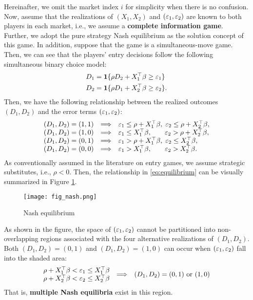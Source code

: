\documentclass[11pt, A4paper, openany, uplatex]{book}
\begin{document}
Hereinafter, we omit the market index $i$ for simplicity when there is no confusion.
Now, assume that the realizations of $(X_1, X_2)$ and $(\varepsilon_1, \varepsilon_2)$ are known to both players in each market, i.e., we assume a \textbf{complete information game}.
Further, we adopt the pure strategy Nash equilibrium as the solution concept of this game.
In addition, suppose that the game is a simultaneous-move game.
Then, we can see that the players' entry decisions follow the following simultaneous binary choice model:
\begin{align}\label{eq:entry}
\begin{split}
D_1 & = \mathbf{1}\{\rho D_2 + X_1^\top \beta \geq \varepsilon_1 \} \\
D_2 & = \mathbf{1}\{\rho D_1 + X_2^\top \beta \geq \varepsilon_2 \}.
\end{split}
\end{align}
Then, we have the following relationship between the realized outcomes $(D_1, D_2)$ and the error terms $(\varepsilon_1, \varepsilon_2)$:
\begin{equation} \label{eq:equilibrium}
\begin{array}{lcl}
(D_1, D_2) = (1, 1) & \Longrightarrow & \varepsilon_1 \le \rho + X_1^\top \beta, \; \varepsilon_2 \le \rho + X_2^\top\beta, \\
(D_1, D_2) = (1, 0) & \Longrightarrow & \varepsilon_1 \le X_1^\top \beta, \;\;\;\;\;\;\;  \varepsilon_2 > \rho + X_2^\top\beta, \\
(D_1, D_2) = (0, 1) & \Longrightarrow & \varepsilon_1 > \rho + X_1^\top \beta, \; \varepsilon_2 \le X_2^\top\beta, \\
(D_1, D_2) = (0, 0) & \Longrightarrow & \varepsilon_1 > X_1^\top \beta, \;\;\;\;\;\;\; \varepsilon_2 > X_2^\top\beta.
\end{array}
\end{equation}
As conventionally assumed in the literature on entry games, we assume strategic substitutes, i.e., $\rho < 0$.
Then, the relationship in \eqref{eq:equilibrium} can be visually summarized in Figure \ref{fig:nash}.
\begin{figure}[h!]
	\begin{center}
		\texttt{[image: fig\_nash.png]}
		\caption{Nash equilibrium}
		\label{fig:nash}
	\end{center}
\end{figure}
As shown in the figure, the space of $(\varepsilon_1, \varepsilon_2)$ cannot be partitioned into non-overlapping regions associated with the four alternative realizations of $(D_1, D_2)$.
Both $(D_1,D_2) = (0, 1)$ and $(D_1, D_2) = (1, 0)$ can occur when $(\varepsilon_1, \varepsilon_2)$ fall into the shaded area:
\[
	\begin{array}{l}
		\rho + X_1^\top\beta < \varepsilon_1 \le X_1^\top\beta \\
		\rho + X_2^\top\beta < \varepsilon_2 \le X_2^\top\beta
	\end{array} 
	\begin{array}{ll}
		\Longrightarrow & \text{$(D_1, D_2) = (0,1)$ or $(1,0)$}
	\end{array}
\]
That is, \textbf{multiple Nash equilibria} exist in this region.
\end{document}
